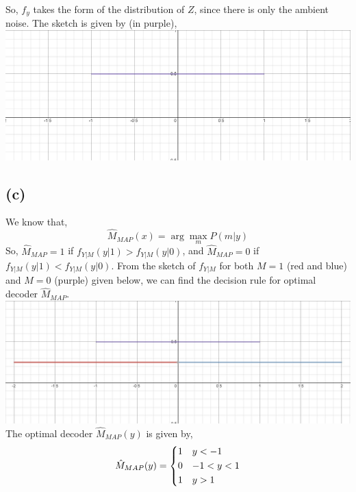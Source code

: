 \documentclass{article}
\begin{document}
	So, $f_y$ takes the form of the distribution of $Z$, since there is only the ambient noise. The sketch is given by (in purple), \hfill \hfill \linebreak
	\includegraphics[width=\textwidth]{plot3}

\subsection*{(c)}
	We know that,
	$$ \hat M_{MAP} (x) = \arg \max_m P(m|y)  $$
	So, $ \hat M_{MAP} = 1$ if $f_{Y|M}(y|1) > f_{Y|M} (y|0)$, and $ \hat M_{MAP} = 0$ if $f_{Y|M}(y|1) < f_{Y|M} (y|0)$. From the sketch of $f_{Y|M}$ for both $M=1$ (red and blue) and $M=0$ (purple) given below, we can find the decision rule for optimal decoder $ \hat M_{MAP}$. \hfill \hfill
\linebreak
	\includegraphics[width=\textwidth]{plot4}
\linebreak
\linebreak
	The optimal decoder $\hat{M}_{MAP} (y)$ is given by,
	$$ \hat{M}_{MAP} (y) = \begin{dcases}
		1 & y<-1 \\
		0 & -1<y<1 \\
		1 & y>1 \\
		\end{dcases}
	$$
\end{document}
